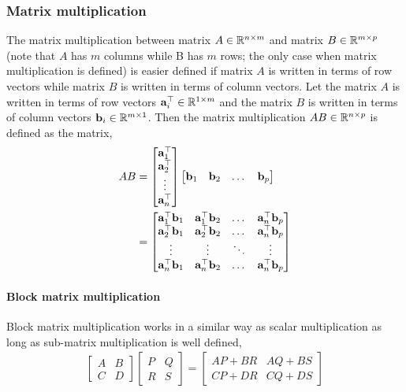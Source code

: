 \documentclass{article}
\begin{document}
\subsubsection{Matrix multiplication}
The matrix multiplication between  matrix  $A \in \mathbb{R}^{n  \times m}$   and
matrix $B  \in \mathbb{R}^{m \times p}$ (note that $A$ has $m$ columns while B has $m$
rows;  the only case when matrix multiplication  is defined) is easier 
defined if matrix $A$  is written in terms  of row vectors while  matrix  $B$ is
written  in  terms  of column vectors. Let  the  matrix $A$  is written in terms
of row   vectors $\mathbf{a}_i^\top   \in \mathbb{R}^{1 \times m}$ and the matrix $B$ is written in terms of column
vectors $\mathbf{b}_i \in \mathbb{R}^{m \times  1}$. Then the matrix multiplication $AB \in
\mathbb{R}^{n \times  p}$ is defined as the matrix,
%
\begin{align}
  AB &= \begin{bmatrix}
    \mathbf{a}_1^\top
    \\
    \mathbf{a}_2^\top
    \\
    \vdots
    \\
    \mathbf{a}_n^\top
    \end{bmatrix}
  \begin{bmatrix}
    \mathbf{b}_1
    &
    \mathbf{b}_2
    &
    \dots
    &
    \mathbf{b}_p
  \end{bmatrix}
      \\
  &= \begin{bmatrix}
    \mathbf{a}_1^\top\mathbf{b}_1 & \mathbf{a}_1^\top\mathbf{b}_2 &  \dots & \mathbf{a}_n^\top \mathbf{b}_p
    \\
    \mathbf{a}_2^\top\mathbf{b}_1 & \mathbf{a}_2^\top\mathbf{b}_2 &  \dots & \mathbf{a}_n^\top \mathbf{b}_p
    \\
    \vdots &  \vdots  &  \ddots  &   \vdots
    \\
    \mathbf{a}_n^\top\mathbf{b}_1 & \mathbf{a}_n^\top\mathbf{b}_2 &  \dots & \mathbf{a}_n^\top \mathbf{b}_p
    \end{bmatrix}
\end{align}

\paragraph{Block matrix  multiplication}
Block matrix multiplication works in a similar way  as scalar multiplication as
long as sub-matrix multiplication is well defined,
%
\begin{align}
  \begin{bmatrix}  A & B \\  C &  D \end{bmatrix}
  \begin{bmatrix}  P & Q \\  R &  S \end{bmatrix}
 =
   \begin{bmatrix}  AP+BR & AQ+BS \\  CP+DR &  CQ+DS \end{bmatrix}
  \end{align}
\end{document}
